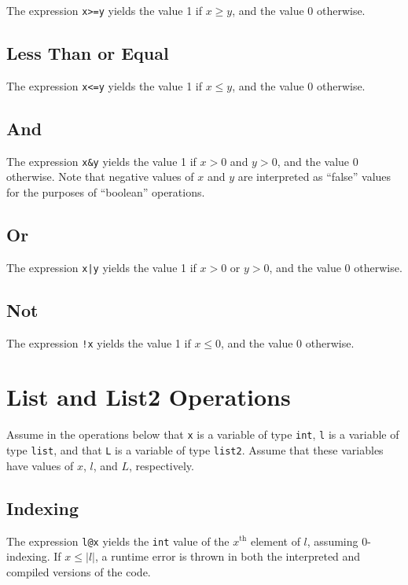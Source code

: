 \documentclass[11pt]{article}
\begin{document}
The expression \texttt{x>=y} yields the value 1 if $x\ge y$, and the value 0 otherwise.

\subsection{Less Than or Equal}

The expression \texttt{x<=y} yields the value 1 if $x\le y$, and the value 0 otherwise.

\subsection{And}

The expression \texttt{x\&y} yields the value 1 if $x>0$ and $y>0$, and the value 0 otherwise. Note that negative values of $x$ and $y$ are interpreted as ``false'' values for the purposes of ``boolean'' operations.

\subsection{Or}

The expression \texttt{x|y} yields the value 1 if $x>0$ or $y>0$, and the value 0 otherwise.

\subsection{Not}

The expression \texttt{!x} yields the value 1 if $x\le 0$, and the value 0 otherwise.

\section{List and List2 Operations}

Assume in the operations below that \texttt{x} is a variable of type \texttt{int}, \texttt{l} is a variable of type \texttt{list}, and that \texttt{L} is a variable of type \texttt{list2}. Assume that these variables have values of $x$, $l$, and $L$, respectively.

\subsection{Indexing}

The expression \texttt{l@x} yields the \texttt{int} value of the $x^{\textrm{th}}$ element of $l$, assuming 0-indexing. If $x\le |l|$, a runtime error is thrown in both the interpreted and compiled versions of the code.\\
\end{document}

